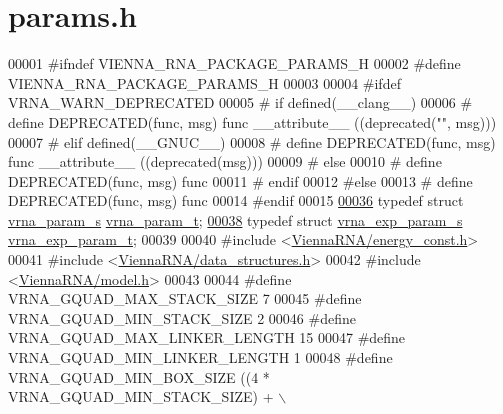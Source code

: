 \hypertarget{params_8h_source}{}\section{params.\+h}
\label{params_8h_source}

\begin{DoxyCode}
00001 \textcolor{preprocessor}{#ifndef VIENNA\_RNA\_PACKAGE\_PARAMS\_H}
00002 \textcolor{preprocessor}{#define VIENNA\_RNA\_PACKAGE\_PARAMS\_H}
00003 
00004 \textcolor{preprocessor}{#ifdef VRNA\_WARN\_DEPRECATED}
00005 \textcolor{preprocessor}{# if defined(\_\_clang\_\_)}
00006 \textcolor{preprocessor}{#  define DEPRECATED(func, msg) func \_\_attribute\_\_ ((deprecated("", msg)))}
00007 \textcolor{preprocessor}{# elif defined(\_\_GNUC\_\_)}
00008 \textcolor{preprocessor}{#  define DEPRECATED(func, msg) func \_\_attribute\_\_ ((deprecated(msg)))}
00009 \textcolor{preprocessor}{# else}
00010 \textcolor{preprocessor}{#  define DEPRECATED(func, msg) func}
00011 \textcolor{preprocessor}{# endif}
00012 \textcolor{preprocessor}{#else}
00013 \textcolor{preprocessor}{# define DEPRECATED(func, msg) func}
00014 \textcolor{preprocessor}{#endif}
00015 
\hyperlink{group__energy__parameters_ga8a69ca7d787e4fd6079914f5343a1f35}{00036} \textcolor{keyword}{typedef} \textcolor{keyword}{struct  }\hyperlink{group__energy__parameters_structvrna__param__s}{vrna\_param\_s} \hyperlink{group__energy__parameters_structvrna__param__s}{vrna\_param\_t};
\hyperlink{group__energy__parameters_ga01d8b92fe734df8d79a6169482c7d8d8}{00038} \textcolor{keyword}{typedef} \textcolor{keyword}{struct  }\hyperlink{group__energy__parameters_structvrna__exp__param__s}{vrna\_exp\_param\_s} \hyperlink{group__energy__parameters_structvrna__exp__param__s}{vrna\_exp\_param\_t};
00039 
00040 \textcolor{preprocessor}{#include <\hyperlink{energy__const_8h}{ViennaRNA/energy\_const.h}>}
00041 \textcolor{preprocessor}{#include <\hyperlink{data__structures_8h}{ViennaRNA/data\_structures.h}>}
00042 \textcolor{preprocessor}{#include <\hyperlink{model_8h}{ViennaRNA/model.h}>}
00043 
00044 \textcolor{preprocessor}{#define   VRNA\_GQUAD\_MAX\_STACK\_SIZE     7}
00045 \textcolor{preprocessor}{#define   VRNA\_GQUAD\_MIN\_STACK\_SIZE     2}
00046 \textcolor{preprocessor}{#define   VRNA\_GQUAD\_MAX\_LINKER\_LENGTH  15}
00047 \textcolor{preprocessor}{#define   VRNA\_GQUAD\_MIN\_LINKER\_LENGTH  1}
00048 \textcolor{preprocessor}{#define   VRNA\_GQUAD\_MIN\_BOX\_SIZE       ((4 * VRNA\_GQUAD\_MIN\_STACK\_SIZE) + \(\backslash\)}

\end{DoxyCode}
